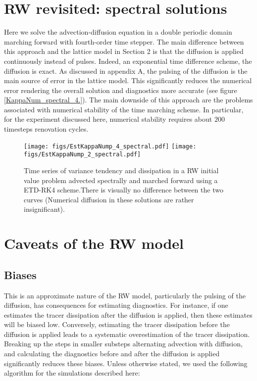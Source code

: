 \documentclass[11pt]{article}
\begin{document}
\section{RW revisited: spectral solutions}
Here we solve the advection-diffusion equation in a double periodic domain marching forward with fourth-order time stepper.
The main difference between this approach and the lattice model in Section 2 is that the diffusion is applied continuously instead of pulses. Indeed, an exponential time difference scheme, the diffusion is exact. As discussed in appendix A, the pulsing of the diffusion is the main source of error in the lattice model. This significantly reduces the numerical error rendering the overall solution and diagnostics more accurate (see figure \ref{KappaNum_spectral_4.}). The main downside of this approach are the problems associated with numerical stability of the time marching scheme. In particular, for the experiment discussed here, numerical stability requires about $200$ timesteps renovation cycles. 

 \begin{figure}[ht]
    \centering
    \texttt{[image: figs/EstKappaNump\_4\_spectral.pdf]}
        \texttt{[image: figs/EstKappaNump\_2\_spectral.pdf]}
    \caption{\small Time series of variance tendency and dissipation in a RW initial value problem advected spectrally
    and marched forward using a ETD-RK4 scheme.There is visually no difference between the two curves (Numerical diffusion
    in these solutions are rather insignificant).}
        \label{KappaNum_spectral_4}
\end{figure}

\clearpage

\appendix

\section{Caveats of the RW model}

\subsection{Biases}
 This is an approximate nature of the RW model, particularly the pulsing of the diffusion, has consequences for estimating diagnostics. For instance, if one estimates the tracer dissipation after the diffusion is applied, then these estimates will be biased low. Conversely, estimating the tracer dissipation before the diffusion is applied leads to a systematic overestimation of the tracer dissipation. Breaking up the steps in smaller substeps alternating advection with diffusion, and calculating the diagnostics before and after the diffusion is applied significantly reduces these biases. Unless otherwise stated, we used the following algorithm for the simulations described here: \\
\end{document}
